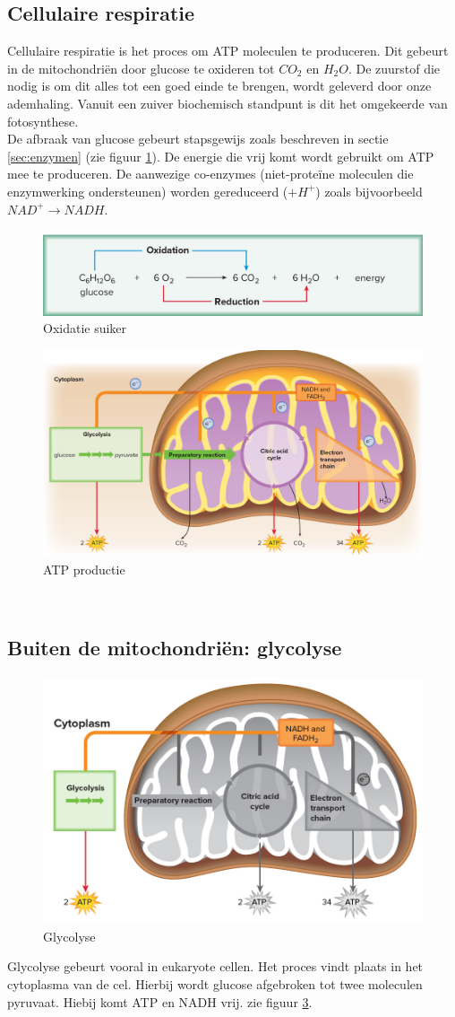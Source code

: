 \documentclass[a4paper,kul]{kulakarticle} %
\begin{document}
\subsection{Cellulaire respiratie}
Cellulaire respiratie is het proces om ATP moleculen te produceren. Dit gebeurt in de mitochondriën door glucose te oxideren tot $CO_2$ en $H_2O$. De zuurstof die nodig is om dit alles tot een goed einde te brengen, wordt geleverd door onze ademhaling. Vanuit een zuiver biochemisch standpunt is dit het omgekeerde van fotosynthese.
\\
De afbraak van glucose gebeurt stapsgewijs zoals beschreven in sectie \ref{sec:enzymen} (zie figuur \ref{fig:oxidatiesuiker}). De energie die vrij komt wordt gebruikt om ATP mee te produceren. De aanwezige co-enzymes (niet-proteïne moleculen die enzymwerking ondersteunen) worden gereduceerd ($+H^+$) zoals bijvoorbeeld $NAD^+ \rightarrow NADH$.
\begin{figure}[h]
	\centering
	\includegraphics[width=0.7\linewidth]{OxidatieSuiker}
	\caption[Oxidatie suiker]{Oxidatie suiker}
	\label{fig:oxidatiesuiker}
\end{figure}
\begin{figure}[h]
	\centering
	\includegraphics[width=0.7\linewidth]{ATPProductie}
	\caption[ATP productie]{ATP productie}
	\label{fig:atpproductie}
\end{figure}\\
\newpage
\subsection{Buiten de mitochondriën: glycolyse}
\begin{figure}[h]
	\centering
	\includegraphics[width=0.5\linewidth]{MitochondriaGlycolyse}
	\caption[Glycolyse]{Glycolyse}
	\label{fig:mitochondriaglycolyse}
\end{figure}
\noindent
Glycolyse gebeurt vooral in eukaryote cellen. Het proces vindt plaats in het cytoplasma van de cel. Hierbij wordt glucose afgebroken tot twee moleculen pyruvaat. Hiebij komt ATP en NADH vrij. zie figuur \ref{fig:mitochondriaglycolyse}.
\end{document}

